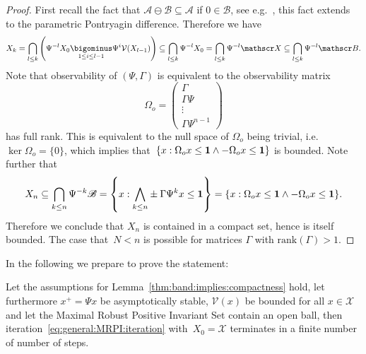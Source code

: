 \begin{proof}
First recall the fact that $\mathcal A\ominus \mathcal B\subseteq\mathcal A$ if $0\in\mathcal B$,
see e.g.~\cite{blanchini:2007}, this fact extends to the parametric Pontryagin difference.
%
Therefore we have
%
\begin{equation}
	X_k= \bigcap_{l\leq k}\left(\Psi^{-l} X_0 \underset{1\leq i\leq l-1}{\bigominus} 
	\Psi^{i}\mathcal V(X_{l-1}) \right) \subseteq \bigcap_{l\leq k} \Psi^{-l} X_0
	= \bigcap_{l\leq k} \Psi^{-l}\mathscr X \subseteq \bigcap_{l\leq k} \Psi^{-l} \mathscr B.
\end{equation}
%
Note that observability of $(\Psi,\Gamma)$ is equivalent to the observability matrix
\[
	\Omega_o = \left(\begin{array}{c}
	\Gamma \\ \Gamma \Psi \\ \vdots \\ \Gamma \Psi^{n-1}
	\end{array}\right)
\]
%
has full rank.
%
This is equivalent to the null space of $\Omega_o$ being trivial, i.e.~$\ker\Omega_o=\{0\}$,
which implies that~$\{x: \Omega_o x \leq {\bf{1}} \wedge -\Omega_o x \leq {\bf{1}}\}$ is bounded.
%
Note further that
\begin{equation}
	X_n \subseteq \bigcap_{k\leq n} \Psi^{-k}\mathscr B = \left\{x:\underset{k\leq n}{\bigwedge} 
	\pm \Gamma\Psi^{k}x\leq{\bf{1}} \right\} =\{x: \Omega_o x \leq {\bf{1}}\wedge -\Omega_o x\leq{\bf{1}} \}.
\end{equation}
%
Therefore we conclude that $X_n$ is contained in a compact set, hence is itself bounded.
%
The case that~$N<n$ is possible for matrices $\Gamma$ with $\text{rank}(\Gamma)>1$.
\end{proof}
%
In the following we prepare to prove the statement:
%
\begin{thm}
\label{thm:finite:terminability:MRPI:algorithm}
Let the assumptions for Lemma~\ref{thm:band:implies:compactness} hold, let furthermore
$x^+=\Psi x$ be asymptotically stable, $\mathcal V(x)$ be bounded for all $x\in\mathscr X$ and let the Maximal Robust 
Positive Invariant Set contain an open ball, then iteration~\eqref{eq:general:MRPI:iteration} with~$X_0=\mathscr X$ 
terminates in a finite number of number of steps.
\end{thm}
